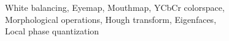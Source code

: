White balancing, Eyemap, Mouthmap, YCbCr colorspace, \\Morphological operations, Hough transform, Eigenfaces, \\ 
Local phase quantization 